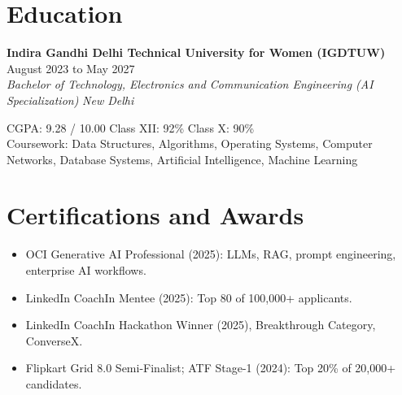 \documentclass[a4paper,10pt]{article}
\newcommand{\entry}[4]{%
  \vspace{3pt}%
  \noindent\textbf{#1} \hfill #2\\[0.4pt]
  \textit{#3} \hfill \textit{#4}\par
  \vspace{1pt}%
}
\begin{document}
\section{Education}
\entry{Indira Gandhi Delhi Technical University for Women (IGDTUW)}{August 2023 to May 2027}
{Bachelor of Technology, Electronics and Communication Engineering (AI Specialization)}{New Delhi}
\noindent CGPA: 9.28 / 10.00 \quad Class XII: 92\% \quad Class X: 90\%\\[1pt]
\noindent Coursework: Data Structures, Algorithms, Operating Systems, Computer Networks, Database Systems, Artificial Intelligence, Machine Learning

\section{Certifications and Awards}
\begin{itemize}
  \item OCI Generative AI Professional (2025): LLMs, RAG, prompt engineering, enterprise AI workflows.
  \item LinkedIn CoachIn Mentee (2025): Top 80 of 100,000+ applicants.
  \item LinkedIn CoachIn Hackathon Winner (2025), Breakthrough Category, ConverseX.
  \item Flipkart Grid 8.0 Semi-Finalist; ATF Stage-1 (2024): Top 20\% of 20,000+ candidates.
\end{itemize}
\end{document}

